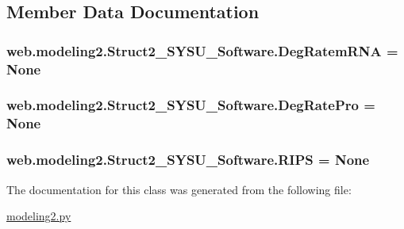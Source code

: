 \subsection{Member Data Documentation}
\hypertarget{classweb_1_1modeling2_1_1_struct2___s_y_s_u___software_a76bff92cc7a6d434f2d4bd0a438da3fa}{
\subsubsection[{Deg\-Ratem\-R\-N\-A}]{\setlength{\rightskip}{0pt plus 5cm}web.\-modeling2.\-Struct2\-\_\-\-S\-Y\-S\-U\-\_\-\-Software.\-Deg\-Ratem\-R\-N\-A = None\hspace{0.3cm}{\ttfamily [static]}}}\label{classweb_1_1modeling2_1_1_struct2___s_y_s_u___software_a76bff92cc7a6d434f2d4bd0a438da3fa}
\hypertarget{classweb_1_1modeling2_1_1_struct2___s_y_s_u___software_af72e06487c032d2863dc53fe71ed21f9}{
\subsubsection[{Deg\-Rate\-Pro}]{\setlength{\rightskip}{0pt plus 5cm}web.\-modeling2.\-Struct2\-\_\-\-S\-Y\-S\-U\-\_\-\-Software.\-Deg\-Rate\-Pro = None\hspace{0.3cm}{\ttfamily [static]}}}\label{classweb_1_1modeling2_1_1_struct2___s_y_s_u___software_af72e06487c032d2863dc53fe71ed21f9}
\hypertarget{classweb_1_1modeling2_1_1_struct2___s_y_s_u___software_a50a0d48cf0b33860910cdbf062e2dedc}{
\subsubsection[{R\-I\-P\-S}]{\setlength{\rightskip}{0pt plus 5cm}web.\-modeling2.\-Struct2\-\_\-\-S\-Y\-S\-U\-\_\-\-Software.\-R\-I\-P\-S = None\hspace{0.3cm}{\ttfamily [static]}}}\label{classweb_1_1modeling2_1_1_struct2___s_y_s_u___software_a50a0d48cf0b33860910cdbf062e2dedc}


The documentation for this class was generated from the following file\-:\begin{DoxyCompactItemize}
\item 
\hyperlink{modeling2_8py}{modeling2.\-py}\end{DoxyCompactItemize}

